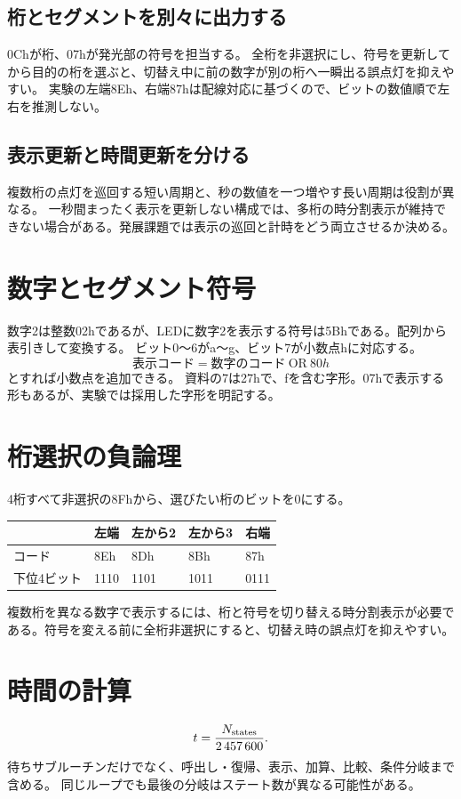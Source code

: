 \documentclass[lualatex,a4paper,10pt]{jlreq}
\begin{document}
\subsection{桁とセグメントを別々に出力する}
0Chが桁、07hが発光部の符号を担当する。
全桁を非選択にし、符号を更新してから目的の桁を選ぶと、切替え中に前の数字が別の桁へ一瞬出る誤点灯を抑えやすい。
実験の左端8Eh、右端87hは配線対応に基づくので、ビットの数値順で左右を推測しない。
\subsection{表示更新と時間更新を分ける}
複数桁の点灯を巡回する短い周期と、秒の数値を一つ増やす長い周期は役割が異なる。
一秒間まったく表示を更新しない構成では、多桁の時分割表示が維持できない場合がある。発展課題では表示の巡回と計時をどう両立させるか決める。

\section{数字とセグメント符号}\label{sec:auto3}
数字2は整数02hであるが、LEDに数字2を表示する符号は5Bhである。配列から表引きして変換する。
ビット0〜6がa〜g、ビット7が小数点hに対応する。
\[
 \text{表示コード}=\text{数字のコード}\ \mathrm{OR}\ 80h
\]
とすれば小数点を追加できる。
資料の7は27hで、fを含む字形。07hで表示する形もあるが、実験では採用した字形を明記する。
\section{桁選択の負論理}\label{sec:auto4}
4桁すべて非選択の8Fhから、選びたい桁のビットを0にする。
\par\noindent\begin{tabularx}{\linewidth}{YYYYY}
\toprule &左端&左から2&左から3&右端\\\midrule
コード&8Eh&8Dh&8Bh&87h\\
下位4ビット&1110&1101&1011&0111\\\bottomrule
\end{tabularx}
複数桁を異なる数字で表示するには、桁と符号を切り替える時分割表示が必要である。符号を変える前に全桁非選択にすると、切替え時の誤点灯を抑えやすい。
\section{時間の計算}\label{sec:auto5}
\[
 t=\frac{N_{\rm states}}{2\,457\,600}.
\]
待ちサブルーチンだけでなく、呼出し・復帰、表示、加算、比較、条件分岐まで含める。
同じループでも最後の分岐はステート数が異なる可能性がある。
\clearpage
\end{document}
